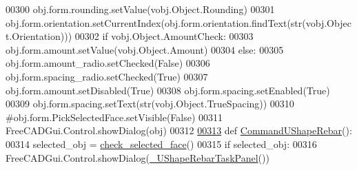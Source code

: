 \begin{DoxyCode}
00300     obj.form.rounding.setValue(vobj.Object.Rounding)
00301     obj.form.orientation.setCurrentIndex(obj.form.orientation.findText(str(vobj.Object.Orientation)))
00302     \textcolor{keywordflow}{if} vobj.Object.AmountCheck:
00303         obj.form.amount.setValue(vobj.Object.Amount)
00304     \textcolor{keywordflow}{else}:
00305         obj.form.amount\_radio.setChecked(\textcolor{keyword}{False})
00306         obj.form.spacing\_radio.setChecked(\textcolor{keyword}{True})
00307         obj.form.amount.setDisabled(\textcolor{keyword}{True})
00308         obj.form.spacing.setEnabled(\textcolor{keyword}{True})
00309         obj.form.spacing.setText(str(vobj.Object.TrueSpacing))
00310     \textcolor{comment}{#obj.form.PickSelectedFace.setVisible(False)}
00311     FreeCADGui.Control.showDialog(obj)
00312 
\hypertarget{UShapeRebar_8py_source.tex_l00313}{}\hyperlink{namespaceUShapeRebar_abd24828525ea7ad774fdff3df325a173}{00313} \textcolor{keyword}{def }\hyperlink{namespaceUShapeRebar_abd24828525ea7ad774fdff3df325a173}{CommandUShapeRebar}():
00314     selected\_obj = \hyperlink{namespaceRebarfunc_adae2713855a7e1b4bda04081ae671542}{check\_selected\_face}()
00315     \textcolor{keywordflow}{if} selected\_obj:
00316         FreeCADGui.Control.showDialog(\hyperlink{classUShapeRebar_1_1__UShapeRebarTaskPanel}{\_UShapeRebarTaskPanel}())
\end{DoxyCode}

